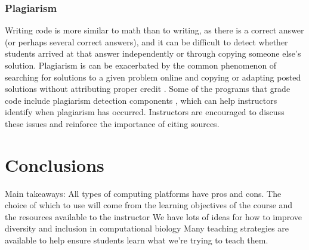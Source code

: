\subsubsection{Plagiarism}
Writing code is more similar to math than to writing, as there is a correct answer (or perhaps several correct answers), and it can be difficult to detect whether students arrived at that answer independently or through copying someone else's solution.
Plagiarism is can be exacerbated by the common phenomenon of searching for solutions to a given problem online and copying or adapting posted solutions without attributing proper credit \cite{gaspar_restoring_2007}. 
Some of the programs that grade code include plagiarism detection components \cite{pears_survey_2007}, which can help instructors identify when plagiarism has occurred.
Instructors are encouraged to discuss these issues and reinforce the importance of citing sources.

\section{Conclusions}

Main takeaways: 
All types of computing platforms have pros and cons.
The choice of which to use will come from the learning objectives of the course and the resources available to the instructor
We have lots of ideas for how to improve diversity and inclusion in computational biology
Many teaching strategies are available to help ensure students learn what we're trying to teach them.




